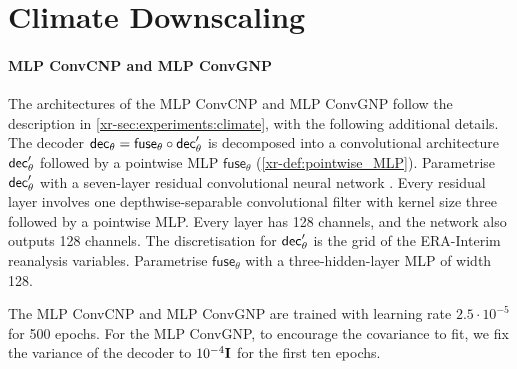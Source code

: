 \documentclass[12pt]{report}
\newcommand{\xrprefix}[1]{xr-#1}
\begin{document}
\section{Climate Downscaling}
\label{sec:experimental_details:climate}

\paragraph{MLP ConvCNP and MLP ConvGNP \parencite[\cref{\xrprefix{sec:experiments:climate}};][]{Vaughan:2022:Convolutional_Conditional_Neural_Processes_for}}
The architectures of the MLP ConvCNP and MLP ConvGNP follow the description in \cref{\xrprefix{sec:experiments:climate}}, with the following additional details.
The decoder $\mathsf{dec}_\theta = \mathsf{fuse}_\theta \circ \mathsf{dec}'_\theta$ is decomposed into a convolutional architecture $\mathsf{dec}'_\theta$ followed by a pointwise MLP $\mathsf{fuse}_\theta$ (\cref{\xrprefix{def:pointwise_MLP}}).
Parametrise $\mathsf{dec}'_\theta$ with a seven-layer residual convolutional neural network \parencite{He:2016:Deep_Residual_Learning_for_Image}.
Every residual layer involves one depthwise-separable convolutional filter \parencite{Chollet:2017:Xception_Deep_Learning_With_Depthwise} with kernel size three followed by a pointwise MLP.
Every layer has 128 channels, and the network also outputs 128 channels.
The discretisation for $\mathsf{dec}'_\theta$ is the grid of the ERA-Interim reanalysis variables.
Parametrise $\mathsf{fuse}_\theta$ with a three-hidden-layer MLP of width 128.

The MLP ConvCNP and MLP ConvGNP are trained with learning rate $2.5 \cdot 10^{-5}$ for 500 epochs.
For the MLP ConvGNP, to encourage the covariance to fit, we fix the variance of the decoder to $10^{-4} \mathbf{I}$ for the first ten epochs.
\end{document}
